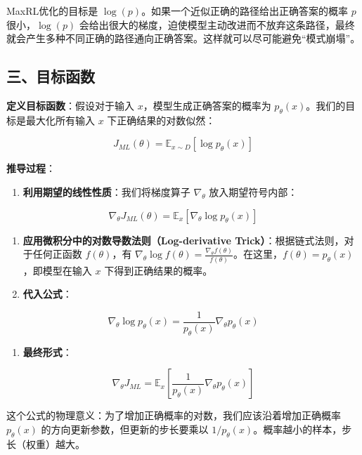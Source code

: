 MaxRL优化的目标是 \(\log(p)\)。如果一个近似正确的路径给出正确答案的概率 \(p\) 很小，\(\log(p)\) 会给出很大的梯度，迫使模型主动改进而不放弃这条路径，最终就会产生多种不同正确的路径通向正确答案。这样就可以尽可能避免``模式崩塌''。

\hypertarget{ux4e09ux76eeux6807ux51fdux6570-1}{%
\subsection{三、目标函数}\label{ux4e09ux76eeux6807ux51fdux6570-1}}

\textbf{定义目标函数}：假设对于输入 \(x\)，模型生成正确答案的概率为 \(p_\theta(x)\)。我们的目标是最大化所有输入 \(x\) 下正确结果的对数似然：

\[
J_{ML}(\theta)=\mathbb{E}_{x\sim D}[\log p_\theta(x)]
\]

\textbf{推导过程}：

\begin{enumerate}
\def\labelenumi{\arabic{enumi}.}
\tightlist
\item
  \textbf{利用期望的线性性质}：我们将梯度算子 \(\nabla_\theta\) 放入期望符号内部：
\end{enumerate}

\[
\nabla_\theta J_{ML}(\theta)=\mathbb{E}_x[\nabla_\theta \log p_\theta(x)]
\]

\begin{enumerate}
\def\labelenumi{\arabic{enumi}.}
\setcounter{enumi}{1}
\item
  \textbf{应用微积分中的对数导数法则（Log-derivative Trick）}：根据链式法则，对于任何正函数 \(f(\theta)\)，有 \(\nabla_\theta \log f(\theta)=\frac{\nabla_\theta f(\theta)}{f(\theta)}\)。在这里，\(f(\theta)=p_\theta(x)\)，即模型在输入 \(x\) 下得到正确结果的概率。
\item
  \textbf{代入公式}：
\end{enumerate}

\[
\nabla_\theta \log p_\theta(x)=\frac{1}{p_\theta(x)}\nabla_\theta p_\theta(x)
\]

\begin{enumerate}
\def\labelenumi{\arabic{enumi}.}
\setcounter{enumi}{3}
\tightlist
\item
  \textbf{最终形式}：
\end{enumerate}

\[
\nabla_\theta J_{ML}=\mathbb{E}_x\left[\frac{1}{p_\theta(x)}\nabla_\theta p_\theta(x)\right]
\]

这个公式的物理意义：为了增加正确概率的对数，我们应该沿着增加正确概率 \(p_\theta(x)\) 的方向更新参数，但更新的步长要乘以 \(1/p_\theta(x)\)。概率越小的样本，步长（权重）越大。


